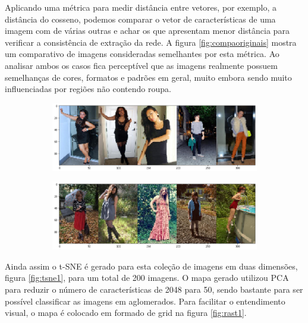 \documentclass[12pt]{report}
\begin{document}
Aplicando uma métrica para medir distância entre vetores, por exemplo, a distância do cosseno, podemos comparar o vetor de características de uma imagem com de várias outras e achar os que apresentam menor distância para verificar a consistência de extração da rede. A figura \ref{fig:compaoriginais} mostra um comparativo de imagens consideradas semelhantes por esta métrica. Ao analisar ambos os casos fica perceptível que as imagens realmente possuem semelhanças de cores, formatos e padrões em geral, muito embora sendo muito influenciadas por regiões não contendo roupa. 

\begin{figure}
  \centering
  \begin{subfigure}[b]{\textwidth}
  \centering
    \includegraphics[scale=0.45]{images/resultados/compaoriginais2.png}
    \label{fig:}
  \end{subfigure}
  \centering
  \begin{subfigure}[b]{\textwidth}
  \centering
    \includegraphics[scale=0.45]{images/resultados/compaoriginais3.png}
    \label{fig:}
  \end{subfigure}
  \label{fig:originais}
\end{figure}

Ainda assim o t-SNE é gerado para esta coleção de imagens em duas dimensões, figura \ref{fig:tsne1}, para um total de 200 imagens. O mapa gerado utilizou PCA para reduzir o número de características de 2048 para 50, sendo bastante para ser possível classificar as imagens em aglomerados. Para facilitar o entendimento visual, o mapa é colocado em formado de grid na figura \ref{fig:rast1}.
\end{document}
